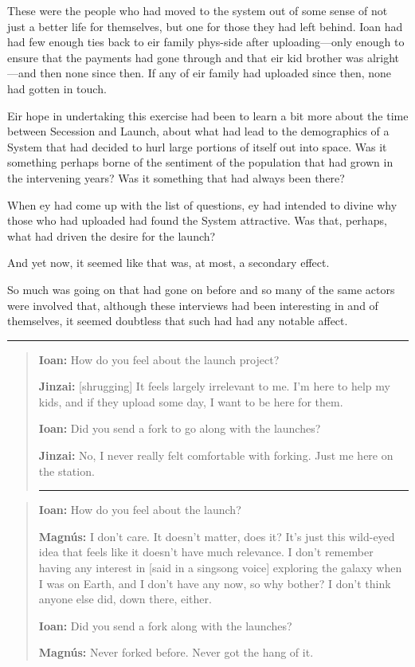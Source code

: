 These were the people who had moved to the system out of some sense of not just a better life for themselves, but one for those they had left behind. Ioan had had few enough ties back to eir family phys-side after uploading---only enough to ensure that the payments had gone through and that eir kid brother was alright---and then none since then. If any of eir family had uploaded since then, none had gotten in touch.

Eir hope in undertaking this exercise had been to learn a bit more about the time between Secession and Launch, about what had lead to the demographics of a System that had decided to hurl large portions of itself out into space. Was it something perhaps borne of the sentiment of the population that had grown in the intervening years? Was it something that had always been there?

When ey had come up with the list of questions, ey had intended to divine why those who had uploaded had found the System attractive. Was that, perhaps, what had driven the desire for the launch?

And yet now, it seemed like that was, at most, a secondary effect.

So much was going on that had gone on before and so many of the same actors were involved that, although these interviews had been interesting in and of themselves, it seemed doubtless that such had had any notable affect.

\begin{center}\rule{0.5\linewidth}{0.5pt}\end{center}

\begin{quote}
\textbf{Ioan:} How do you feel about the launch project?

\textbf{Jinzai:} {[}shrugging{]} It feels largely irrelevant to me. I'm here to help my kids, and if they upload some day, I want to be here for them.

\textbf{Ioan:} Did you send a fork to go along with the launches?

\textbf{Jinzai:} No, I never really felt comfortable with forking. Just me here on the station.

\begin{center}\rule{0.5\linewidth}{0.5pt}\end{center}
\end{quote}

\begin{quote}
\textbf{Ioan:} How do you feel about the launch?

\textbf{Magnús:} I don't care. It doesn't matter, does it? It's just this wild-eyed idea that feels like it doesn't have much relevance. I don't remember having any interest in {[}said in a singsong voice{]} exploring the galaxy when I was on Earth, and I don't have any now, so why bother? I don't think anyone else did, down there, either.

\textbf{Ioan:} Did you send a fork along with the launches?

\textbf{Magnús:} Never forked before. Never got the hang of it.
\end{quote}

